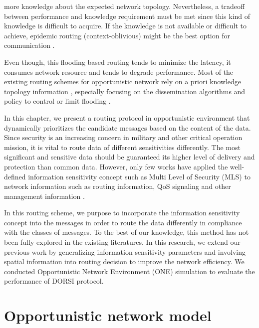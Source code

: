 more knowledge about the expected network topology. Nevertheless, a tradeoff between performance and knowledge requirement must be met since this kind of knowledge is difficult to acquire. If the knowledge is not available or difficult to achieve, epidemic routing (context-oblivious) might be the best option for communication \cite{bonaldo2011}.

Even though, this flooding based routing tends to minimize the latency, it consumes network resource and tends to degrade performance. Most of the existing routing schemes for opportunistic network rely on a priori knowledge topology information \cite{Pelusi2006}, especially focusing on the dissemination algorithms and policy to control or limit flooding \cite{Plymoth2010}.

In this chapter, we present a routing protocol in opportunistic environment that dynamically prioritizes the candidate messages based on the content of the data. Since security is an increasing concern in military and other critical operation mission, it is vital to route data of different sensitivities differently. The most significant and sensitive data should be guaranteed its higher level of delivery and protection than common data. However, only few works have applied the well-defined information sensitivity concept such as Multi Level of Security (MLS) \cite{Kotrappa2010,marking2010} to network information such as routing information, QoS signaling and other management information \cite{Winjum2008}.

In this routing scheme, we purpose to incorporate the information sensitivity concept into the messages in order to route the data differently in compliance with the classes of messages. To the best of our knowledge, this method has not been fully explored in the existing literatures. In this research, we extend our previous work \cite{Kerdsri2012} by generalizing information sensitivity parameters and involving spatial information into routing decision to improve the network efficiency. We conducted Opportunistic Network Environment (ONE) simulation \cite{Keranen2009b} to evaluate the performance of DORSI protocol.

\section{Opportunistic network model}
\label{DORSI:Opportunistic network model}


